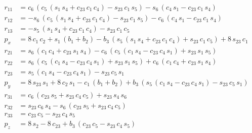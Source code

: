 \documentclass{homework}
\begin{document}
\begin{sol}
\begin{align*} 
r_{11} &= c_{6}\,\left(c_{5}\,\left(s_{1}\,s_{4}+c_{23}\,c_{1}\,c_{4}\right)-s_{23}\,c_{1}\,s_{5}\right)-s_{6}\,\left(c_{4}\,s_{1}-c_{23}\,c_{1}\,s_{4}\right) \\ 
r_{12} &= -s_{6}\,\left(c_{5}\,\left(s_{1}\,s_{4}+c_{23}\,c_{1}\,c_{4}\right)-s_{23}\,c_{1}\,s_{5}\right)-c_{6}\,\left(c_{4}\,s_{1}-c_{23}\,c_{1}\,s_{4}\right) \\ 
r_{13} &= -s_{5}\,\left(s_{1}\,s_{4}+c_{23}\,c_{1}\,c_{4}\right)-s_{23}\,c_{1}\,c_{5} \\ 
p_x &= 8\,c_{1}\,c_{2}+s_{1}\,\left(b_{1}+b_{2}\right)-b_{3}\,\left(s_{5}\,\left(s_{1}\,s_{4}+c_{23}\,c_{1}\,c_{4}\right)+s_{23}\,c_{1}\,c_{5}\right)+8\,s_{23}\,c_{1} \\ 
r_{21} &= s_{6}\,\left(c_{1}\,c_{4}+c_{23}\,s_{1}\,s_{4}\right)-c_{6}\,\left(c_{5}\,\left(c_{1}\,s_{4}-c_{23}\,c_{4}\,s_{1}\right)+s_{23}\,s_{1}\,s_{5}\right) \\ 
r_{22} &= s_{6}\,\left(c_{5}\,\left(c_{1}\,s_{4}-c_{23}\,c_{4}\,s_{1}\right)+s_{23}\,s_{1}\,s_{5}\right)+c_{6}\,\left(c_{1}\,c_{4}+c_{23}\,s_{1}\,s_{4}\right) \\ 
r_{23} &= s_{5}\,\left(c_{1}\,s_{4}-c_{23}\,c_{4}\,s_{1}\right)-s_{23}\,c_{5}\,s_{1} \\ 
p_y &= 8\,s_{23}\,s_{1}+8\,c_{2}\,s_{1}-c_{1}\,\left(b_{1}+b_{2}\right)+b_{3}\,\left(s_{5}\,\left(c_{1}\,s_{4}-c_{23}\,c_{4}\,s_{1}\right)-s_{23}\,c_{5}\,s_{1}\right) \\ 
r_{31} &= c_{6}\,\left(c_{23}\,s_{5}+s_{23}\,c_{4}\,c_{5}\right)+s_{23}\,s_{4}\,s_{6} \\ 
r_{32} &= s_{23}\,c_{6}\,s_{4}-s_{6}\,\left(c_{23}\,s_{5}+s_{23}\,c_{4}\,c_{5}\right) \\ 
r_{33} &= c_{23}\,c_{5}-s_{23}\,c_{4}\,s_{5} \\ 
p_z &= 8\,s_{2}-8\,c_{23}+b_{3}\,\left(c_{23}\,c_{5}-s_{23}\,c_{4}\,s_{5}\right)
\end{align*}
  
\end{sol}

\question 
\end{document}
